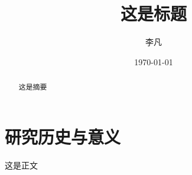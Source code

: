 \documentclass[11pt,a4paper]{article}
\title{这是标题}
\author{李凡}
\date{\today}
\numberwithin{equation}{section} %
\begin{document}
\maketitle
\begin{abstract}
这是摘要
\end{abstract}
\section{研究历史与意义}
这是正文
\begin{thebibliography}{99}

\end{thebibliography}
\clearpage
\end{document}
